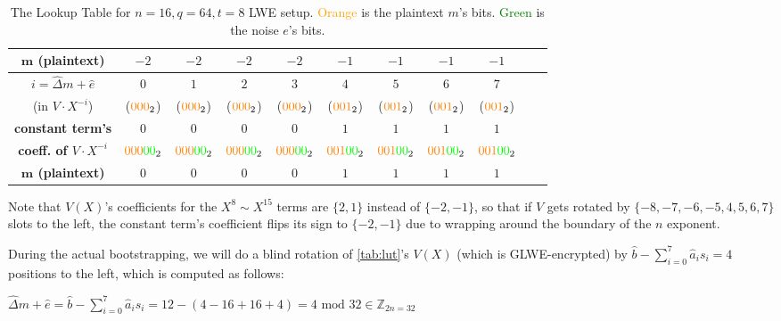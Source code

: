 \begin{enumerate}
\begin{table}[h]
\begin{tabular}{|c||c|c|c|c|c|c|c|c|c|c|}
\hline
\textbf{$\bm{m}$ (plaintext)} & $-2$ & $-2$ & $-2$ & $-2$ & $-1$ & $-1$ & $-1$ & $-1$ \\
\hline
\hline
\textbf{\boldmath$i = \hat{\Delta}m + \hat{e}$} & $0$ & $1$ & $2$ & $3$ & $4$ & $5$ & $6$ & $7$ \\
(in $V \cdot X^{-i}$) & ($\textcolor{cyan}{}\textcolor{orange}{000}_2$)& ($\textcolor{cyan}{}\textcolor{orange}{000}_2$)& ($\textcolor{cyan}{}\textcolor{orange}{000}_2$)& ($\textcolor{cyan}{}\textcolor{orange}{000}_2$)& ($\textcolor{cyan}{}\textcolor{orange}{001}_2$)& ($\textcolor{cyan}{}\textcolor{orange}{001}_2$)& ($\textcolor{cyan}{}\textcolor{orange}{001}_2$)&($\textcolor{cyan}{}\textcolor{orange}{001}_2$)\\
\hline
\textbf{constant term's} & $0$ & $0$ & $0$ & $0$ & $1$ & $1$ & $1$ & $1$ \\
\textbf{coeff. of $V\cdot X^{-i}$}& $\textcolor{orange}{000}\textcolor{green}{00}_2$ & $\textcolor{orange}{000}\textcolor{green}{00}_2$ & $\textcolor{orange}{000}\textcolor{green}{00}_2$ & $\textcolor{orange}{000}\textcolor{green}{00}_2$ & $\textcolor{orange}{001}\textcolor{green}{00}_2$ & $\textcolor{orange}{001}\textcolor{green}{00}_2$ & $\textcolor{orange}{001}\textcolor{green}{00}_2$ & $\textcolor{orange}{001}\textcolor{green}{00}_2$ \\
\hline
\textbf{$\bm{m}$ (plaintext)} & $0$ & $0$ & $0$ & $0$ & $1$ & $1$ & $1$ & $1$ \\
\hline
\end{tabular}
\centering
\caption{The Lookup Table for $n=16, q=64, t=8$ LWE setup.
\textcolor{orange}{Orange} is the plaintext $m$'s bits. \textcolor{green}{Green} is the noise $e$'s bits. %
}
\label{tab:lut}
\end{table}

Note that $V(X)$'s coefficients for the $X^8 \sim X^{15}$ terms are $\{2, 1\}$ instead of $\{-2, -1\}$, so that if $V$ gets rotated by $\{-8,-7,-6,-5,4,5,6,7\}$ slots to the left, the constant term's coefficient flips its sign to $\{-2, -1\}$ due to wrapping around the boundary of the $n$ exponent. 

During the actual bootstrapping, we will do a blind rotation of \autoref{tab:lut}'s $V(X)$ (which is GLWE-encrypted) by $\hat{b} - \sum\limits_{i=0}^{7}\hat{a}_is_i = 4$ positions to the left, which is computed as follows:

$\hat\Delta m + \hat e = \hat{b} - \sum\limits_{i=0}^{7}\hat{a}_is_i = 12 - (4 - 16 + 16 + 4) = 4 \text{ mod 32} \in \mathbb{Z}_{2n=32}$ 



\end{enumerate}
